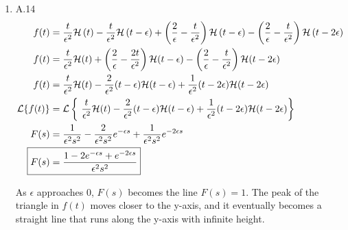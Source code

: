\documentclass[12pt]{article}
\begin{document}
\begin{enumerate}
\newpage
    \item A.14
    \begin{align*}
        f(t) &=  \frac{t}{\epsilon^2}\mathcal{H}\left(t\right) - \frac{t}{\epsilon^2}\mathcal{H}\left(t-\epsilon\right) + \left( \frac{2}{\epsilon} - \frac{t}{\epsilon^2} \right) \mathcal{H}\left(t-\epsilon\right) - \left( \frac{2}{\epsilon} - \frac{t}{\epsilon^2} \right) \mathcal{H}\left(t-2\epsilon\right) \\
        f(t) &= \frac{t}{\epsilon^2} \mathcal{H}(t) + \left( \frac{2}{\epsilon} - \frac{2t}{\epsilon^2} \right) \mathcal{H}(t-\epsilon) - \left( \frac{2}{\epsilon} - \frac{t}{\epsilon^2} \right) \mathcal{H}(t-2\epsilon) \\
        f(t) &= \frac{t}{\epsilon^2} \mathcal{H}(t) - \frac{2}{\epsilon^2} (t-\epsilon) \mathcal{H}(t-\epsilon) + \frac{1}{\epsilon^2} (t-2\epsilon) \mathcal{H}(t-2\epsilon) \\
        \mathcal{L}\{f(t)\} &= \mathcal{L}\left\{\ \frac{t}{\epsilon^2} \mathcal{H}(t) - \frac{2}{\epsilon^2} (t-\epsilon) \mathcal{H}(t-\epsilon) + \frac{1}{\epsilon^2} (t-2\epsilon) \mathcal{H}(t-2\epsilon) \right\} \\
        F(s) &= \frac{1}{\epsilon^2 s^2} - \frac{2}{\epsilon^2 s^2} e^{-\epsilon s} + \frac{1}{\epsilon^2 s^2} e^{-2 \epsilon s} \\
        \Aboxed{F(s) &= \frac{1 - 2 e^{-\epsilon s} + e^{-2 \epsilon s}}{\epsilon^2 s^2}}
    \end{align*}


    As $\epsilon$ approaches 0, $F(s)$ becomes the line $F(s)=1$. The peak of the triangle in $f(t)$ moves closer to the y-axis, and it eventually becomes a straight line that runs along the y-axis with infinite height. 



\end{enumerate}
\end{document}

